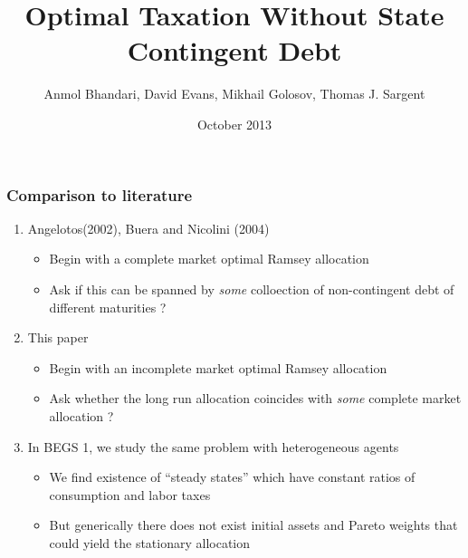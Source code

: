 \documentclass{beamer}
\title {Optimal Taxation Without State Contingent Debt}
\author{Anmol Bhandari, David Evans, Mikhail Golosov, Thomas J. Sargent}
\date{October 2013}
\begin{document}
%




\begin{frame}
 \frametitle{Comparison to literature}
 \begin{enumerate}
  \item Angelotos(2002), Buera and Nicolini (2004)
  
\begin{itemize}
 \item Begin with a complete market optimal Ramsey allocation
 \item Ask if this can be spanned by \emph{some} colloection of non-contingent debt of different maturities ? 
\end{itemize}
\item This paper
\begin{itemize}
 \item Begin with an incomplete market optimal Ramsey allocation
 \item Ask whether the long run allocation coincides with \emph{some} complete market allocation ?
\end{itemize}

\item In BEGS 1, we study the same problem with heterogeneous agents 
\begin{itemize}
 \item We find existence of ``steady states'' which have constant ratios of consumption and labor taxes 
 \item But generically there does not exist initial assets and Pareto weights that could yield the stationary allocation
\end{itemize}


  
 \end{enumerate}


\end{frame}

  
\end{document}
